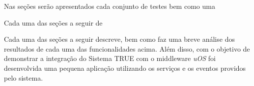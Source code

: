 	Nas seções serão apresentados cada conjunto de testes bem como uma 
	
	Cada uma das seções a seguir de 

	Cada uma das seções a seguir descreve, bem como faz uma breve análise dos
	resultados de cada uma das funcionalidades acima. Além disso, com o objetivo de
	demonstrar a integração do Sistema TRUE com o middleware \textit{uOS} foi desenvolvida uma pequena
	aplicação utilizando os serviços e os eventos providos pelo sistema. 

	

	

	

	